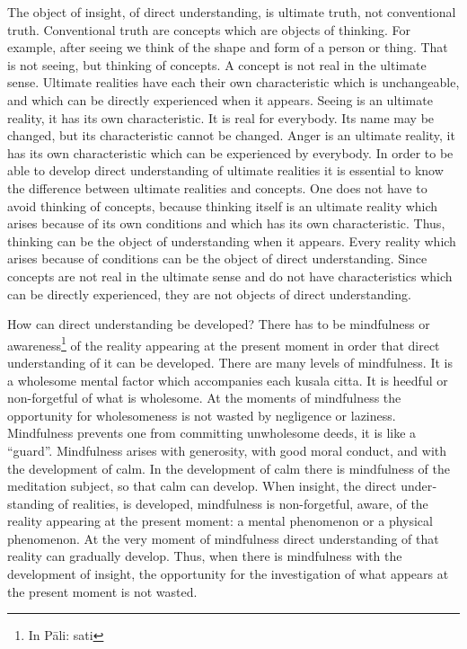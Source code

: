 \documentclass{book}
\begin{document}
The object of insight, of direct under­standing, is ultimate truth, not
conventional truth. Conventional truth are concepts which are objects of
thinking. For example, after seeing we think of the shape and form of a
person or thing. That is not seeing, but thinking of concepts. A concept
is not real in the ultimate sense. Ultimate realities have each their
own characteristic which is unchangeable, and which can be directly
experienced when it appears. Seeing is an ultimate reality, it has its
own characteristic. It is real for everybody. Its name may be changed,
but its characteristic cannot be changed. Anger is an ultimate reality,
it has its own characteristic which can be experienced by everybody. In
order to be able to develop direct understanding of ultimate realities
it is essential to know the difference between ultimate realities and
concepts. One does not have to avoid thinking of concepts, because 
thinking itself is an ultimate reality which arises because of its own
conditions and which has its own characteristic. Thus, thinking can be
the object of understanding when it appears. Every reality which arises
because of conditions can be the object of direct under­standing. Since
concepts are not real in the ultimate sense and do not have
characteristics which can be directly experienced, they are not objects
of direct understanding.

How can direct understanding be developed? There has to be mindfulness
or awareness\footnote{In Pāli: sati} of the reality appearing at the
present moment in order that direct understanding of it can be
developed. There are many levels of mind­fulness. It is a wholesome
mental factor which accom­panies each kusala citta. It is heedful or
non-forgetful of what is wholesome. At the moments of mindfulness the
opportunity for wholesomeness is not wasted by negli­gence or laziness.
Mindfulness prevents one from committ­ing unwholesome deeds, it is like
a ``guard''. Mindfulness arises with generosity, with good moral
conduct, and with the development of calm. In the development of calm
there is mindfulness of the meditation subject, so that calm can
develop. When insight, the direct under­standing of realities, is
developed, mindfulness is non-forgetful, aware, of the reality      appearing at the present moment: a mental phenomenon or a physical phenomenon. At the very moment of mindfulness direct understanding 
of that reality can gradually develop. Thus, when there is mindfulness  with the development of insight, the opportunity for the investigation    of what appears at the present moment is not wasted.
\end{document}
